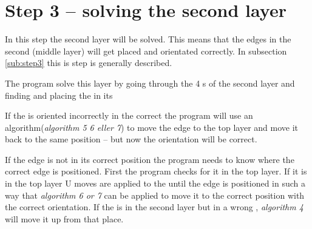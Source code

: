 \section{Step 3 -- solving the second layer}
In this step the second layer will be solved. 
This means that the edges in the second (middle layer) will get placed and orientated correctly. 
In subsection \ref{sub:step3} this is step is generally described. 

The program solve this layer by going through the 4 \cubicle{}s of the second layer and finding and placing the \cpiece{} in its \cubicle{}

If the \cpiece is oriented incorrectly in the correct \cubicle{} the program will use an algorithm(\textit{algorithm 5 6 eller 7})  to move the edge \cpiece{} to the top layer and move it back to the same position -- but now the orientation will be correct. 

If the edge \cpiece{} is not in its correct position the program needs to know where the correct edge \cpiece{} is positioned. First the program checks for it in the top layer. 
If it is in the top layer U moves are applied to the \rubik{} until the edge \cpiece{} is positioned in such a way that \textit{algorithm 6 or 7} can be applied to move it to the correct position with the correct orientation. 
If the \cpiece{} is in the second layer but in a wrong \cubicle{}, \textit{algorithm 4} will move it up from that place. 

